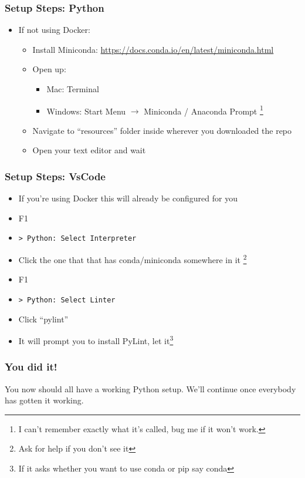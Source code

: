 \documentclass{beamer}
\begin{document}
\begin{frame}
  \frametitle{Setup Steps: Python}

  \begin{itemize}
    \item If not using Docker:
      \begin{itemize}
        \item Install Miniconda: \url{https://docs.conda.io/en/latest/miniconda.html}
        \item Open up:
          \begin{itemize}
            \item Mac: Terminal
            \item Windows: Start Menu $\rightarrow$ Miniconda / Anaconda Prompt
            \footnote{I can't remember exactly what it's called, bug me if it won't work.}
          \end{itemize}
        \pause
        \item Navigate to ``resources'' folder inside wherever you downloaded
              the repo
        \item Open your text editor and wait
      \end{itemize}
  \end{itemize}
\end{frame}
\begin{frame}
  \frametitle{Setup Steps: VsCode}
  \begin{itemize}
    \item If you're using Docker this will already be configured for you
    \item F1
    \item \texttt{> Python: Select Interpreter}
    \item Click the one that that has conda/miniconda somewhere in it
    \footnote{Ask for help if you don't see it}
    \item F1
    \item \texttt{> Python: Select Linter}
    \item Click ``pylint''
    \item It will prompt you to install PyLint, let it\footnote{If it asks
          whether you want to use conda or pip say conda}
  \end{itemize}
\end{frame}
\begin{frame}
  \frametitle{You did it!}
  You now should all have a working Python setup.  We'll continue once
  everybody has gotten it working.
\end{frame}
\end{document}
